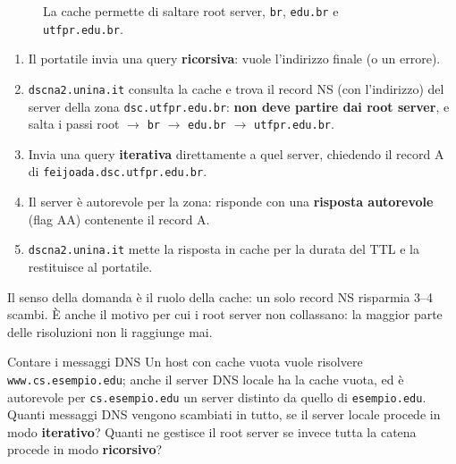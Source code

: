 \svolgimento
\begin{figure}[H]
\centering
{}
\caption{La cache permette di saltare root server, \texttt{br}, \texttt{edu.br} e \texttt{utfpr.edu.br}.}
\end{figure}
\begin{enumerate}
    \item Il portatile invia una query \textbf{ricorsiva}: vuole l'indirizzo finale (o un errore).
    \item \texttt{dscna2.unina.it} consulta la cache e trova il record NS (con l'indirizzo) del server della zona
          \texttt{dsc.utfpr.edu.br}: \textbf{non deve partire dai root server}, e salta i passi root $\rightarrow$ \texttt{br}
          $\rightarrow$ \texttt{edu.br} $\rightarrow$ \texttt{utfpr.edu.br}.
    \item Invia una query \textbf{iterativa} direttamente a quel server, chiedendo il record A di \texttt{feijoada.dsc.utfpr.edu.br}.
    \item Il server è autorevole per la zona: risponde con una \textbf{risposta autorevole} (flag AA) contenente il record A.
    \item \texttt{dscna2.unina.it} mette la risposta in cache per la durata del TTL e la restituisce al portatile.
\end{enumerate}
Il senso della domanda è il ruolo della cache: un solo record NS risparmia 3--4 scambi. È anche il motivo per cui i root
server non collassano: la maggior parte delle risoluzioni non li raggiunge mai.

\begin{esercizio}{Contare i messaggi DNS}
Un host con cache vuota vuole risolvere \texttt{www.cs.esempio.edu}; anche il server DNS locale ha la cache vuota, ed è
autorevole per \texttt{cs.esempio.edu} un server distinto da quello di \texttt{esempio.edu}. Quanti messaggi DNS vengono scambiati
in tutto, se il server locale procede in modo \textbf{iterativo}? Quanti ne gestisce il root server se invece tutta la
catena procede in modo \textbf{ricorsivo}?
\end{esercizio}

